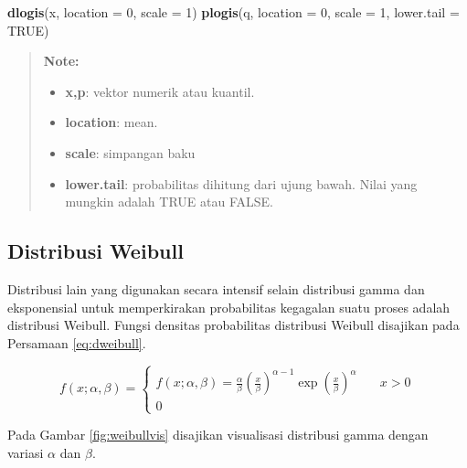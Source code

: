\documentclass[]{book}
\newenvironment{Shaded}{\begin{snugshade}}{\end{snugshade}}
\newcommand{\KeywordTok}[1]{\textcolor[rgb]{0.13,0.29,0.53}{\textbf{#1}}}
\newcommand{\DataTypeTok}[1]{\textcolor[rgb]{0.13,0.29,0.53}{#1}}
\newcommand{\DecValTok}[1]{\textcolor[rgb]{0.00,0.00,0.81}{#1}}
\newcommand{\OtherTok}[1]{\textcolor[rgb]{0.56,0.35,0.01}{#1}}
\newcommand{\NormalTok}[1]{#1}
\providecommand{\tightlist}{%
  \setlength{\itemsep}{0pt}\setlength{\parskip}{0pt}}
\begin{document}
\begin{Shaded}
\begin{Highlighting}[]
\KeywordTok{dlogis}\NormalTok{(x, }\DataTypeTok{location =} \DecValTok{0}\NormalTok{, }\DataTypeTok{scale =} \DecValTok{1}\NormalTok{)}
\KeywordTok{plogis}\NormalTok{(q, }\DataTypeTok{location =} \DecValTok{0}\NormalTok{, }\DataTypeTok{scale =} \DecValTok{1}\NormalTok{, }\DataTypeTok{lower.tail =} \OtherTok{TRUE}\NormalTok{)}
\end{Highlighting}
\end{Shaded}

\begin{quote}
\textbf{Note: }

\begin{itemize}
\tightlist
\item
  \textbf{x,p}: vektor numerik atau kuantil.
\item
  \textbf{location}: mean.
\item
  \textbf{scale}: simpangan baku
\item
  \textbf{lower.tail}: probabilitas dihitung dari ujung bawah. Nilai
  yang mungkin adalah TRUE atau FALSE.
\end{itemize}
\end{quote}

\subsection{Distribusi Weibull}\label{distribusi-weibull}

Distribusi lain yang digunakan secara intensif selain distribusi gamma
dan eksponensial untuk memperkirakan probabilitas kegagalan suatu proses
adalah distribusi Weibull. Fungsi densitas probabilitas distribusi
Weibull disajikan pada Persamaan \eqref{eq:dweibull}.

\begin{equation}
f\left(x;\alpha,\beta \right) =
  \begin{cases}
    f\left(x;\alpha,\beta\right)=\frac{\alpha}{\beta}\left(\frac{x}{\beta}\right)^{\alpha-1}\exp\left(\frac{x}{\beta}\right)^{\alpha}     & \quad x>0\\
    0                   & \quad\text{}
    \end{cases}
 \label{eq:dweibull}
\end{equation}

Pada Gambar \ref{fig:weibullvis} disajikan visualisasi distribusi gamma
dengan variasi \(\alpha\) dan \(\beta\).
\end{document}
